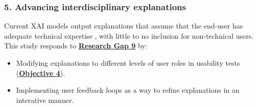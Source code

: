 
\subsubsection*{5. Advancing interdisciplinary explanations}
Current XAI models output explanations that assume that the end-user has adequate technical expertise \citep{greco2023explaining}, with little to no inclusion for non-technical users. This study responds to \hyperref[research-gap-9]{\uline{\textbf{Research Gap 9}}} by:

\begin{itemize}
  \item Modifying explanations to different levels of user roles in usability tests (\hyperref[objective-4]{\uline{\textbf{Objective 4}}}).
  \item Implementing user feedback loops as a way to refine explanations in an interative manner.
\end{itemize}
